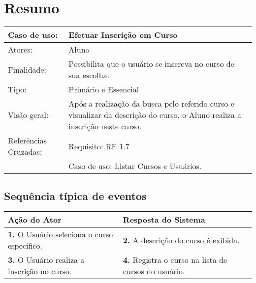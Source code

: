\documentclass[12pt,a4paper,onecolumn,titlepage]{article}
\begin{document}
\section{Resumo}
\begin{table}[h!]
\begin{center}
\begin{tabular}{p{2.5cm} p{9.5cm}}
Caso de uso: & \textbf{Efetuar Inscrição em Curso} \\ \hline
Atores: & Aluno \\ \hline
Finalidade: & Possibilita que o usuário se inscreva no curso de sua escolha. \\ \hline
Tipo: & Primário e Essencial\\ \hline
Visão geral: & Após a realização da busca pelo referido curso e visualizar da descrição do curso, o Aluno realiza a inscrição neste curso. \\ \hline
Referências Cruzadas: & Requisito: RF 1.7 \\ & Caso de uso: Listar Cursos e Usuários.

\end{tabular}
\end{center}
\end{table}

\subsection{Sequência típica de eventos}
\begin{center}
\def\arraystretch{1.1}
\begin{tabular}{|p{6cm}|p{6cm}|}

\hline
\textbf{Ação do Ator} & \textbf{Resposta do Sistema} \\ \hline
\textbf{1.} O Usuário seleciona o curso específico. & \textbf{2.} A descrição do curso é exibida. \\ \hline
\textbf{3.} O Usuário realiza a inscrição no curso. & \textbf{4.} Registra o curso na lista de cursos do usuário. \\ \hline
\end{tabular}
\end{center}

\newpage


\end{document}

